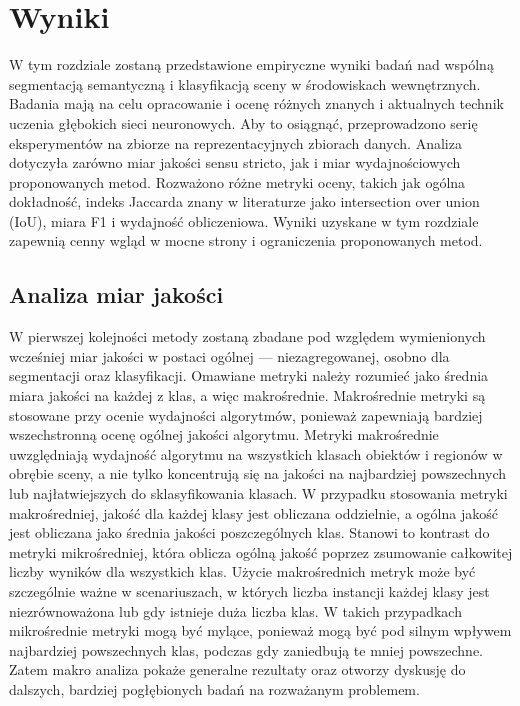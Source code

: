 \clearpage
\newpage %

\section{Wyniki}

W tym rozdziale zostaną przedstawione empiryczne wyniki badań nad wspólną segmentacją semantyczną i klasyfikacją sceny w środowiskach wewnętrznych. Badania mają na celu opracowanie i ocenę różnych znanych i aktualnych technik uczenia głębokich sieci neuronowych. Aby to osiągnąć, przeprowadzono serię eksperymentów na zbiorze na reprezentacyjnych zbiorach danych. Analiza dotyczyła zarówno miar jakości sensu stricto, jak i miar wydajnościowych proponowanych metod. Rozważono różne metryki oceny, takich jak ogólna dokładność, indeks Jaccarda znany w literaturze jako intersection over union (IoU), miara F1 i wydajność obliczeniowa. Wyniki uzyskane w tym rozdziale zapewnią cenny wgląd w mocne strony i ograniczenia proponowanych metod.

\subsection{Analiza miar jakości}
W pierwszej kolejności metody zostaną zbadane pod względem wymienionych wcześniej miar jakości w postaci ogólnej — niezagregowanej, osobno dla segmentacji oraz klasyfikacji. Omawiane metryki należy rozumieć jako średnia miara jakości na każdej z klas, a więc makrośrednie. Makrośrednie metryki są stosowane przy ocenie wydajności algorytmów, ponieważ zapewniają bardziej wszechstronną ocenę ogólnej jakości algorytmu. Metryki makrośrednie uwzględniają wydajność algorytmu na wszystkich klasach obiektów i regionów w obrębie sceny, a nie tylko koncentrują się na jakości na najbardziej powszechnych lub najłatwiejszych do sklasyfikowania klasach. W przypadku stosowania metryki makrośredniej, jakość dla każdej klasy jest obliczana oddzielnie, a ogólna jakość jest obliczana jako średnia jakości poszczególnych klas. Stanowi to kontrast do metryki mikrośredniej, która oblicza ogólną jakość poprzez zsumowanie całkowitej liczby wyników dla wszystkich klas.
Użycie makrośrednich metryk może być szczególnie ważne w scenariuszach, w których liczba instancji każdej klasy jest niezrównoważona lub gdy istnieje duża liczba klas. W takich przypadkach mikrośrednie metryki mogą być mylące, ponieważ mogą być pod silnym wpływem najbardziej powszechnych klas, podczas gdy zaniedbują te mniej powszechne. Zatem makro analiza pokaże generalne rezultaty oraz otworzy dyskusję do dalszych, bardziej pogłębionych badań na rozważanym problemem.

